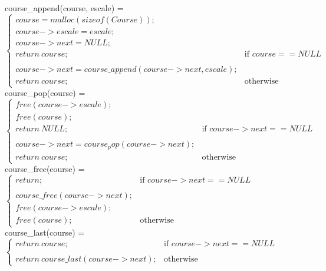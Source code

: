 course\_append(course, escale) = \\$
                \begin{cases}
                    course = malloc(sizeof(Course)); \\
                    course->escale = escale; \\
                    course->next = NULL; \\
                    return\ course; & \text{if } course == NULL \\
                    \\
                    course->next = course\_append(course->next, escale);\\
                    return\ course; & \text{otherwise}
                \end{cases} $
\\

course\_pop(course) = \\$
                \begin{cases}
                    free(course->escale); \\
                    free(course); \\
                    return\ NULL; & \text{if } course->next == NULL \\
                    \\
                    course->next = course_pop(course->next);\\
                    return\ course; & \text{otherwise}
                \end{cases} $
\\

course\_free(course) = \\$
                \begin{cases}
                    return; & \text{if } course->next == NULL \\
                    \\
                    course\_free(course->next); \\
                    free(course->escale); \\
                    free(course); & \text{otherwise}
                \end{cases} $
\\

course\_last(course) = \\$
                \begin{cases}
                    return\ course; & \text{if } course->next == NULL \\
                    \\
                    return\ course\_last(course->next); & \text{otherwise}
                \end{cases} $
